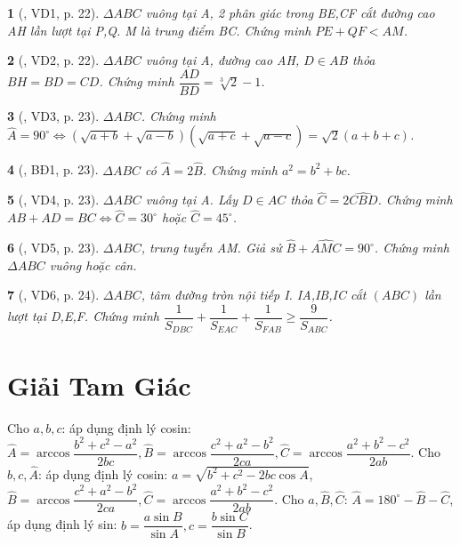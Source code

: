 \documentclass{article}
\newtheorem{baitoan}{}
\begin{document}
\begin{baitoan}[\cite{Hai_Hung_Thu_Tung2022_tap_1}, VD1, p. 22]
	$\Delta ABC$ vuông tại A, 2 phân giác trong BE,CF cắt đường cao AH lần lượt tại P,Q. M là trung điểm BC. Chứng minh $PE + QF < AM$.
\end{baitoan}

\begin{baitoan}[\cite{Hai_Hung_Thu_Tung2022_tap_1}, VD2, p. 22]
	$\Delta ABC$ vuông tại A, đường cao AH, $D\in AB$ thỏa $BH = BD = CD$. Chứng minh $\dfrac{AD}{BD} = \sqrt[3]{2} - 1$.
\end{baitoan}

\begin{baitoan}[\cite{Hai_Hung_Thu_Tung2022_tap_1}, VD3, p. 23]
	$\Delta ABC$. Chứng minh $\widehat{A} = 90^\circ\Leftrightarrow(\sqrt{a + b} + \sqrt{a - b})(\sqrt{a + c} + \sqrt{a - c}) = \sqrt{2}(a + b + c)$.
\end{baitoan}

\begin{baitoan}[\cite{Hai_Hung_Thu_Tung2022_tap_1}, BĐ1, p. 23]
	$\Delta ABC$ có $\widehat{A} = 2\widehat{B}$. Chứng minh $a^2 = b^2 + bc$.
\end{baitoan}

\begin{baitoan}[\cite{Hai_Hung_Thu_Tung2022_tap_1}, VD4, p. 23]
	$\Delta ABC$ vuông tại A. Lấy $D\in AC$ thỏa $\widehat{C} = 2\widehat{CBD}$. Chứng minh $AB + AD = BC\Leftrightarrow\widehat{C} = 30^\circ$ hoặc $\widehat{C} = 45^\circ$.
\end{baitoan}

\begin{baitoan}[\cite{Hai_Hung_Thu_Tung2022_tap_1}, VD5, p. 23]
	$\Delta ABC$, trung tuyến AM. Giả sử $\widehat{B} + \widehat{AMC} = 90^\circ$. Chứng minh $\Delta ABC$ vuông hoặc cân.
\end{baitoan}

\begin{baitoan}[\cite{Hai_Hung_Thu_Tung2022_tap_1}, VD6, p. 24]
	$\Delta ABC$, tâm đường tròn nội tiếp I. IA,IB,IC cắt $(ABC)$ lần lượt tại D,E,F. Chứng minh $\dfrac{1}{S_{DBC}} + \dfrac{1}{S_{EAC}} + \dfrac{1}{S_{FAB}}\ge\dfrac{9}{S_{ABC}}$.
\end{baitoan}


\section{Giải Tam Giác}
 Cho $a,b,c$: áp dụng định lý cosin: $\widehat{A} = \arccos\dfrac{b^2 + c^2 - a^2}{2bc},\widehat{B} = \arccos\dfrac{c^2 + a^2 - b^2}{2ca},\widehat{C} = \arccos\dfrac{a^2 + b^2 - c^2}{2ab}$.  Cho $b,c,\widehat{A}$: áp dụng định lý cosin: $a = \sqrt{b^2 + c^2 - 2bc\cos A}$, $\widehat{B} = \arccos\dfrac{c^2 + a^2 - b^2}{2ca},\widehat{C} = \arccos\dfrac{a^2 + b^2 - c^2}{2ab}$.  Cho $a,\widehat{B},\widehat{C}$: $\widehat{A} = 180^\circ - \widehat{B} - \widehat{C}$, áp dụng định lý sin: $b = \dfrac{a\sin B}{\sin A},c = \dfrac{b\sin C}{\sin B}$.
\end{document}
